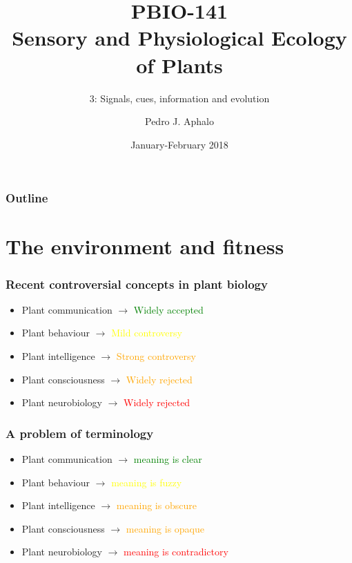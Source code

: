 \documentclass[10pt]{beamer}
\begin{document}
\title{PBIO-141\\Sensory and Physiological Ecology\\ of  Plants}
\subtitle{3: Signals, cues, information and evolution}
\author{Pedro J. Aphalo}
\date{January-February 2018}


  \begin{frame}
    \maketitle
  \end{frame}



  \begin{frame}
    \frametitle{Outline}
    \tableofcontents
  \end{frame}


\section{The environment and fitness}

\begin{frame}
\frametitle{Recent controversial concepts in plant biology}
\begin{itemize}
\item Plant communication $\rightarrow$ \textcolor{green}{Widely accepted}
\item Plant behaviour $\rightarrow$ \textcolor{yellow}{Mild controversy}
\item Plant intelligence $\rightarrow$ \textcolor{orange}{Strong controversy}
\item Plant consciousness $\rightarrow$ \textcolor{orange}{Widely rejected}
\item Plant neurobiology $\rightarrow$ \textcolor{red}{Widely rejected}
\end{itemize}
\end{frame}

\begin{frame}
\frametitle{A problem of terminology}
\begin{itemize}
\item Plant communication $\rightarrow$ \textcolor{green}{meaning is clear}
\item Plant behaviour $\rightarrow$ \textcolor{yellow}{meaning is fuzzy}
\item Plant intelligence $\rightarrow$ \textcolor{orange}{meaning is obscure}
\item Plant consciousness $\rightarrow$ \textcolor{orange}{meaning is opaque}
\item Plant neurobiology $\rightarrow$ \textcolor{red}{meaning is contradictory}
\end{itemize}
\end{frame}
\end{document}
